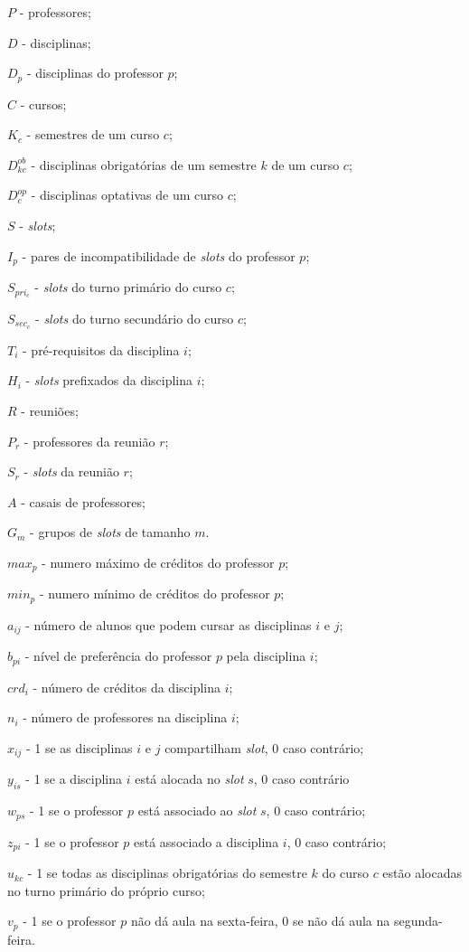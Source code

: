 \begin{alineascomponto}
    \item $P$ - professores;
    \item $D$ - disciplinas;
    \item $D_p$ - disciplinas do professor $p$;
    \item $C$ - cursos;
    \item $K_c$ - semestres de um curso $c$;
    \item $D_{kc}^{ob}$ - disciplinas obrigatórias de um semestre $k$ de um curso $c$;
    \item $D_{c}^{op}$ - disciplinas optativas de um curso $c$;
	\item $S$ - \textit{slots};
	\item $I_p$ - pares de incompatibilidade de \textit{slots} do professor $p$;
	\item $S_{pri_c}$ - \textit{slots} do turno primário do curso $c$;
	\item $S_{sec_c}$ - \textit{slots} do turno secundário do curso $c$;
	\item $T_i$ - pré-requisitos da disciplina $i$;
	\item $H_i$ - \textit{slots} prefixados da disciplina $i$;
	\item $R$ - reuniões;
	\item $P_r$ - professores da reunião $r$;
	\item $S_r$ - \textit{slots} da reunião $r$;
	\item $A$ - casais de professores;
	\item $G_m$ - grupos de \textit{slots} de tamanho $m$.
	\item $max_p$ - numero máximo de créditos do professor $p$;
    \item $min_p$ - numero mínimo de créditos do professor $p$;
	\item $a_{ij}$ - número de alunos que podem cursar as disciplinas $i$ e $j$;
	\item $b_{pi}$ - nível de preferência do professor $p$ pela disciplina $i$;	
	\item $crd_i$ - número de créditos da disciplina $i$;
	\item $n_i$ - número de professores na disciplina $i$;
    \item $x_{ij}$ - 1 se as disciplinas  $i$ e $j$ compartilham \textit{slot}, 0 caso contrário;
	\item $y_{is}$ - 1 se a disciplina $i$ está alocada no \textit{slot} $s$, 0 caso contrário
	\item $w_{ps}$ - 1 se o professor $p$ está associado ao \textit{slot} $s$, 0 caso contrário;
	\item $z_{pi}$ - 1 se o professor $p$ está associado a disciplina $i$, 0 caso contrário;
	\item $u_{kc}$ - 1 se todas as disciplinas obrigatórias do semestre $k$ do curso $c$ estão alocadas no turno primário do próprio curso;
	\item $v_p$ - 1 se o professor $p$ não dá aula na sexta-feira, 0 se não dá aula na segunda-feira.
\end{alineascomponto} 

